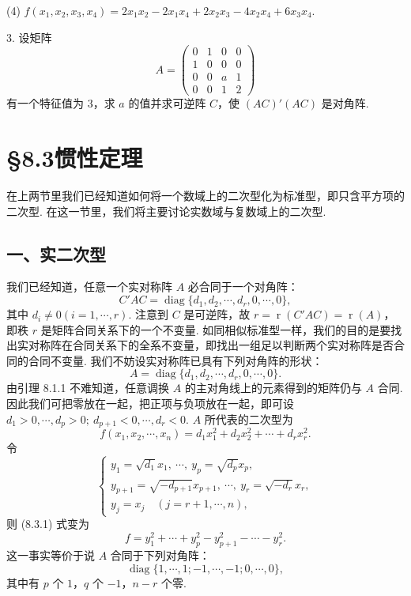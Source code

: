 \documentclass[UTF8,12pt,a4paper,fontset=fandol]{ctexart}
\begin{document}
(4) $f(x_1,x_2,x_3,x_4)=2x_1x_2-2x_1x_4+2x_2x_3-4x_2x_4+6x_3x_4$.

3. 设矩阵
\[
A=\left(\begin{array}{cccc}
0&1&0&0\\
1&0&0&0\\
0&0&a&1\\
0&0&1&2
\end{array}\right)
\]
有一个特征值为 3，求 $a$ 的值并求可逆阵 $C$，使 $(AC)'(AC)$ 是对角阵.

\section*{§8.3\quad 惯性定理}

在上两节里我们已经知道如何将一个数域上的二次型化为标准型，即只含平方项的二次型. 在这一节里，我们将主要讨论实数域与复数域上的二次型.

\subsection*{一、实二次型}

我们已经知道，任意一个实对称阵 $A$ 必合同于一个对角阵：
\[
C'AC=\operatorname{diag}\{d_1,d_2,\cdots,d_r,0,\cdots,0\},
\]
其中 $d_i\neq0(i=1,\cdots,r)$. 注意到 $C$ 是可逆阵，故 $r=\operatorname{r}(C'AC)=\operatorname{r}(A)$，即秩 $r$ 是矩阵合同关系下的一个不变量. 如同相似标准型一样，我们的目的是要找出实对称阵在合同关系下的全系不变量，即找出一组足以判断两个实对称阵是否合同的合同不变量. 我们不妨设实对称阵已具有下列对角阵的形状：
\[
A=\operatorname{diag}\{d_1,d_2,\cdots,d_r,0,\cdots,0\}.
\]
由引理 8.1.1 不难知道，任意调换 $A$ 的主对角线上的元素得到的矩阵仍与 $A$ 合同. 因此我们可把零放在一起，把正项与负项放在一起，即可设 $d_1>0,\cdots,d_p>0;\ d_{p+1}<0,\cdots,d_r<0$. $A$ 所代表的二次型为
\begin{equation}
f(x_1,x_2,\cdots,x_n)=d_1x_1^2+d_2x_2^2+\cdots+d_rx_r^2.
\tag{8.3.1}
\end{equation}
令
\[
\left\{\begin{array}{l}
y_1=\sqrt{d_1}x_1,\ \cdots,\ y_p=\sqrt{d_p}x_p,\\
y_{p+1}=\sqrt{-d_{p+1}}x_{p+1},\ \cdots,\ y_r=\sqrt{-d_r}x_r,\\
y_j=x_j\quad (j=r+1,\cdots,n),
\end{array}\right.
\]
则 (8.3.1) 式变为
\begin{equation}
f=y_1^2+\cdots+y_p^2-y_{p+1}^2-\cdots-y_r^2.
\tag{8.3.2}
\end{equation}
这一事实等价于说 $A$ 合同于下列对角阵：
\begin{equation}
\operatorname{diag}\{1,\cdots,1;-1,\cdots,-1;0,\cdots,0\},
\tag{8.3.3}
\end{equation}
其中有 $p$ 个 $1$，$q$ 个 $-1$，$n-r$ 个零.
\end{document}

